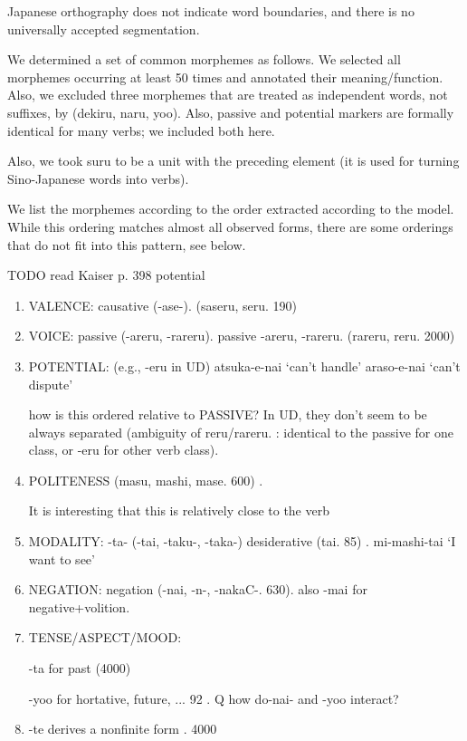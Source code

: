 Japanese orthography does not indicate word boundaries, and there is no universally accepted segmentation.

We determined a set of common morphemes as follows.
We selected all morphemes occurring at least 50 times and annotated their meaning/function.
Also, we excluded three morphemes that are treated as independent words, not suffixes, by \cite{kaiser2013japanese} (dekiru, naru, yoo).
Also, passive and potential markers are formally identical for many verbs; we included both here.

Also, we took suru to be a unit with the preceding element (it is used for turning Sino-Japanese words into verbs).

We list the morphemes according to the order extracted according to the model.
While this ordering matches almost all observed forms, there are some orderings that do not fit into this pattern, see below.



TODO read Kaiser p. 398 potential

\begin{enumerate}
\item VALENCE: causative (-ase-). \cite[142]{hasegawa2014japanese} \cite[Chapter 13]{kaiser2013japanese} (saseru, seru. 190)
\item VOICE: passive (-areru, -rareru). passive \cite[152]{hasegawa2014japanese} \cite[Chapter 12]{kaiser2013japanese} -areru, -rareru. (rareru, reru. 2000)
\item POTENTIAL: (e.g., -eru in UD)  atsuka-e-nai `can't handle' %
araso-e-nai `can't dispute' %

how is this ordered relative to PASSIVE? In UD, they don't seem to be always separated (ambiguity of reru/rareru. \cite[346]{vaccari1938complete}: identical to the passive for one class, or -eru for other verb class).
\item POLITENESS (masu, mashi, mase. 600) \cite[190]{kaiser2013japanese}. %

It is interesting that this is relatively close to the verb

\item MODALITY: -ta- (-tai, -taku-, -taka-) desiderative (tai. 85) \cite[238]{kaiser2013japanese}. mi-mashi-tai `I want to see'
\item NEGATION: negation (-nai, -n-, -nakaC-. 630). also -mai for negative+volition.
\item TENSE/ASPECT/MOOD:

-ta for past (4000)

-yoo for hortative, future, ... 92 \cite[229]{kaiser2013japanese}. Q how do-nai- and -yoo interact?
\item -te derives a nonfinite form \cite[186]{kaiser2013japanese}. 4000
\end{enumerate}

